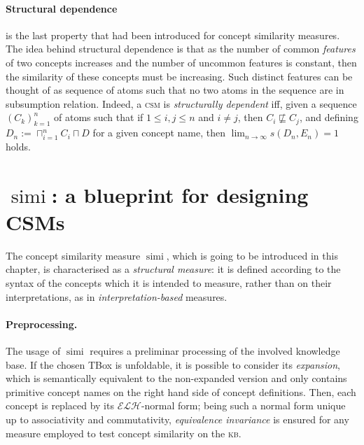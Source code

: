 \documentclass[]{llncs}
\DeclareMathOperator{\simi}{simi}
\newcommand{\elh}{\(\mathcal{ELH}{}\)}
\newcommand{\kb}{\textsc{kb}}
\newcommand{\csm}{\textsc{csm}}
\begin{document}
  \paragraph{Structural dependence} is the last property that had been introduced for concept similarity measures.
  The idea behind structural dependence is that as the number of common \emph{features} of two concepts increases and the number of uncommon features is constant, then the similarity of these concepts must be increasing.
  Such distinct features can be thought of as sequence of atoms such that no two atoms in the sequence are in subsumption relation.
  Indeed, a \csm{} is \emph{structurally dependent} iff, given a sequence \({(C_k)}_{k=1}^n\) of atoms such that if \(1 \le i,j \le n\) and \(i \ne j\), then \(C_i \not\sqsubseteq C_j\), and defining \(D_n := \sqcap_{i=1}^n C_i \sqcap D\) for a given concept name, then \(\lim_{n \to \infty}s(D_n,E_n) = 1\) holds.

  \section{\(\simi{}\): a blueprint for designing CSMs}

  The concept similarity measure \(\simi\), which is going to be introduced in this chapter, is characterised as a \emph{structural measure}: it is defined according to the syntax of the concepts which it is intended to measure, rather than on their interpretations, as in \emph{interpretation-based} measures.

  \paragraph{Preprocessing.}
  The usage of \(\simi{}\) requires a preliminar processing of the involved knowledge base.
  If the chosen TBox is unfoldable, it is possible to consider its \emph{expansion}, which is semantically equivalent to the non-expanded version and only contains primitive concept names on the right hand side of concept definitions.
  Then, each concept is replaced by its \elh-normal form; being such a normal form unique up to associativity and commutativity, \emph{equivalence invariance} is ensured for any measure employed to test concept similarity on the \kb.
\end{document}
